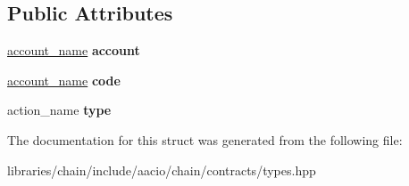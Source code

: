 \subsection*{Public Attributes}
\begin{DoxyCompactItemize}
\item 
\mbox{\label{structaacio_1_1chain_1_1contracts_1_1unlinkauth_a7680abd3179cfab9c5ec069cde17cd95}} 
\mbox{\hyperlink{structaacio_1_1chain_1_1name}{account\+\_\+name}} {\bfseries account}
\item 
\mbox{\label{structaacio_1_1chain_1_1contracts_1_1unlinkauth_a0d998da57fe2faeb6403231b3d5c5092}} 
\mbox{\hyperlink{structaacio_1_1chain_1_1name}{account\+\_\+name}} {\bfseries code}
\item 
\mbox{\label{structaacio_1_1chain_1_1contracts_1_1unlinkauth_a254c7f7cee1035154c7af5a47296681f}} 
action\+\_\+name {\bfseries type}
\end{DoxyCompactItemize}


The documentation for this struct was generated from the following file\+:\begin{DoxyCompactItemize}
\item 
libraries/chain/include/aacio/chain/contracts/types.\+hpp\end{DoxyCompactItemize}

